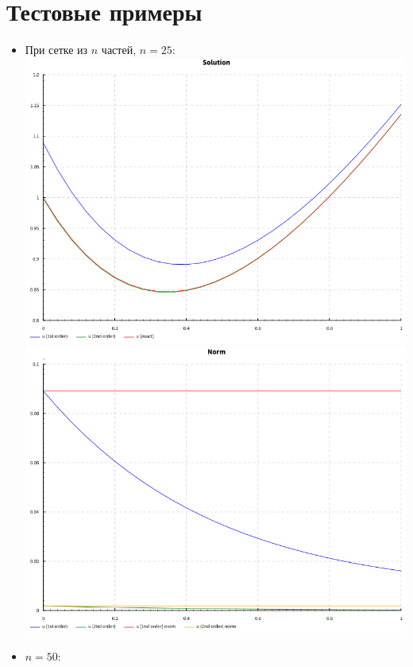 \documentclass[a4paper,12pt]{article}
\begin{document}
\section{\normalsize{Тестовые примеры}}
\begin{flushleft}
  \begin{itemize}
    \item При сетке из $n$ частей, $n=25$:\linebreak
      \includegraphics[scale=0.6]{solition_25.png}\linebreak
      \includegraphics[scale=0.6]{norm_25.png}\linebreak
    \item $n=50$:\linebreak

\end{itemize}
\end{flushleft}
\end{document}
